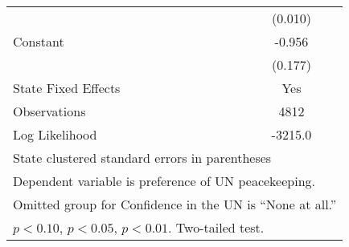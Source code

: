 \begin{table}[htbp]
\begin{tabular}{l*{1}{c}}
                    &     (0.010)        \\
[0.5em]
Constant            &      -0.956\sym{**}\\
                    &     (0.177)        \\
\hline
State Fixed Effects &         Yes        \\
Observations        &    4812        \\
Log Likelihood      &    -3215.0        \\
\hline\hline
\multicolumn{2}{l}{\footnotesize State clustered standard errors in parentheses}\\
\multicolumn{2}{l}{\footnotesize Dependent variable is preference of UN peacekeeping.}\\
\multicolumn{2}{l}{\footnotesize Omitted group for Confidence in the UN is ``None at all.''}\\
\multicolumn{2}{l}{\footnotesize \sym{+} \(p<0.10\), \sym{*} \(p<0.05\), \sym{**} \(p<0.01\). Two-tailed test.}\\
\end{tabular}
\end{table}
